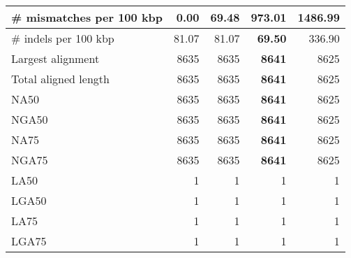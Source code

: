 \documentclass[12pt,a4paper]{article}
\begin{document}
\begin{table}[ht]
\begin{center}
\begin{tabular}{|l*{4}{|r}|}
\# mismatches per 100 kbp & {\bf 0.00} & 69.48 & 973.01 & 1486.99 \\ \hline
\# indels per 100 kbp & 81.07 & 81.07 & {\bf 69.50} & 336.90 \\ \hline
Largest alignment & 8635 & 8635 & {\bf 8641} & 8625 \\ \hline
Total aligned length & 8635 & 8635 & {\bf 8641} & 8625 \\ \hline
NA50 & 8635 & 8635 & {\bf 8641} & 8625 \\ \hline
NGA50 & 8635 & 8635 & {\bf 8641} & 8625 \\ \hline
NA75 & 8635 & 8635 & {\bf 8641} & 8625 \\ \hline
NGA75 & 8635 & 8635 & {\bf 8641} & 8625 \\ \hline
LA50 & 1 & 1 & 1 & 1 \\ \hline
LGA50 & 1 & 1 & 1 & 1 \\ \hline
LA75 & 1 & 1 & 1 & 1 \\ \hline
LGA75 & 1 & 1 & 1 & 1 \\ \hline
\end{tabular}
\end{center}
\end{table}
\end{document}
